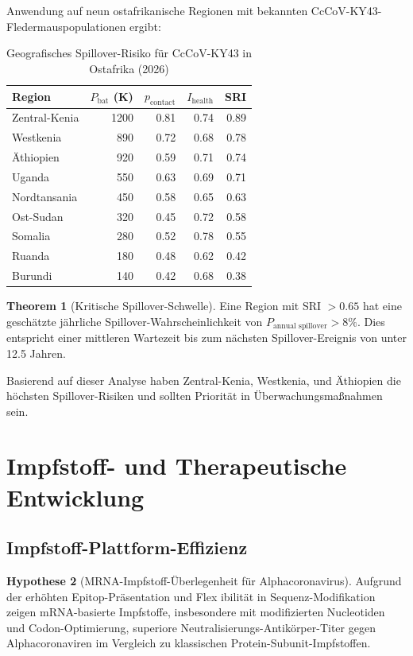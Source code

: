 ﻿\documentclass[11pt,a4paper]{article}
\theoremstyle{definition}
\newtheorem{theorem}{Theorem}[section]
\newtheorem{hypothesis}[theorem]{Hypothese}
\begin{document}
Anwendung auf neun ostafrikanische Regionen mit bekannten CcCoV-KY43-Fledermauspopu\-lationen ergibt:

\begin{table}[H]
\centering
\begin{tabular}{lrrrr}
\toprule
Region & $P_{\text{bat}}$ (K) & $p_{\text{contact}}$ & $I_{\text{health}}$ & SRI \\
\midrule
Zentral-Kenia & 1200 & 0.81 & 0.74 & 0.89 \\
Westkenia & 890 & 0.72 & 0.68 & 0.78 \\
Äthiopien & 920 & 0.59 & 0.71 & 0.74 \\
Uganda & 550 & 0.63 & 0.69 & 0.71 \\
Nordtansania & 450 & 0.58 & 0.65 & 0.63 \\
Ost-Sudan & 320 & 0.45 & 0.72 & 0.58 \\
Somalia & 280 & 0.52 & 0.78 & 0.55 \\
Ruanda & 180 & 0.48 & 0.62 & 0.42 \\
Burundi & 140 & 0.42 & 0.68 & 0.38 \\
\bottomrule
\end{tabular}
\caption{Geografisches Spillover-Risiko für CcCoV-KY43 in Ostafrika (2026)}
\end{table}

\begin{theorem}[Kritische Spillover-Schwelle]
Eine Region mit SRI $> 0.65$ hat eine geschätzte jährliche Spillover-Wahrscheinlichkeit von $P_{\text{annual spillover}} > 8\%$. Dies entspricht einer mittleren Wartezeit bis zum nächsten Spillover-Ereignis von unter 12.5 Jahren.
\end{theorem}

Basierend auf dieser Analyse haben Zentral-Kenia, Westkenia, und Äthiopien die höchsten Spillover-Risiken und sollten Priorität in Überwachungsmaßnahmen sein.

\section{Impfstoff- und Therapeutische Entwicklung}

\subsection{Impfstoff-Plattform-Effizienz}

\begin{hypothesis}[MRNA-Impfstoff-Überlegenheit für Alphacoronavirus]
Aufgrund der erhöhten Epitop-Präsentation und Flex ­ibilität in Sequenz-Modifikation zeigen mRNA-basierte Impfstoffe, insbesondere mit modifizierten Nucleotiden und Codon-Optimierung, superiore Neutralisierungs-Antikörper-Titer gegen Alphacoronaviren im Vergleich zu klassischen Protein-Subunit-Impfstoffen.
\end{hypothesis}
\end{document}
